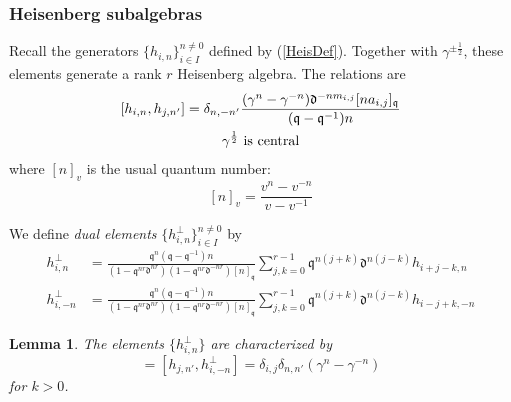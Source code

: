 \documentclass{amsart}
\newcommand{\qqq}{\mathfrak{q}}
\newcommand{\ddd}{\mathfrak{d}}
\newtheorem{lem}[thm]{Lemma}
\theoremstyle{remark}
\numberwithin{thm}{section}
\numberwithin{equation}{section}
\begin{document}
\subsubsection{Heisenberg subalgebras}
Recall the generators $\{h_{i,n}\}_{i\in I}^{n\not=0}$ defined by (\ref{HeisDef}).
Together with $\gamma^{\pm\frac{1}{2}}$, these elements generate a rank $r$ Heisenberg algebra.
The relations are
\begin{gather}
\label{HeisRel}     [h_{i, n}, h_{j,n'}]=\delta_{n,-n'}\frac{(\gamma^n-\gamma^{-n})\ddd^{-nm_{i,j}}[na_{i,j}]_{\qqq}}{(\qqq-\qqq^{-1})n}\\
\nonumber    \gamma^{\frac{1}{2}}\hbox{ is central}
\end{gather}
where $[n]_v$ is the usual quantum number:
\[
[n]_v=\frac{v^n-v^{-n}}{v-v^{-1}}
\]

We define \textit{dual elements} $\{h_{i,n}^\perp\}_{i\in I}^{n\not=0}$ by
\begin{equation}
\label{DualForm}
\begin{aligned}
h_{i,n}^\perp&=
\frac{\qqq^{n}(\qqq-\qqq^{-1})n}{(1-\qqq^{nr}\ddd^{nr})(1-\qqq^{nr}\ddd^{-nr})[n]_\qqq}
\sum_{j,k=0}^{r-1} \qqq^{n(j+k)}\ddd^{n(j-k)}h_{i+j-k, n}\\
h_{i,-n}^\perp&=
\frac{\qqq^{n}(\qqq-\qqq^{-1})n}{(1-\qqq^{nr}\ddd^{nr})(1-\qqq^{nr}\ddd^{-nr})[n]_\qqq}
\sum_{j,k=0}^{r-1} \qqq^{n(j+k)}\ddd^{n(j-k)}h_{i-j+k,-n}
\end{aligned}   
\end{equation}

\begin{lem}
   The elements $\{h_{i,n}^\perp\}$ are characterized by
 \begin{equation}
[h_{i,n}^\perp, h_{j,-n'}]=[h_{j,n'}, h_{i,-n}^\perp]=\delta_{i,j}\delta_{n,n'}(\gamma^n-\gamma^{-n})
\label{DualHeis}
\end{equation}  
for $k>0$.
\end{lem}
\end{document}
